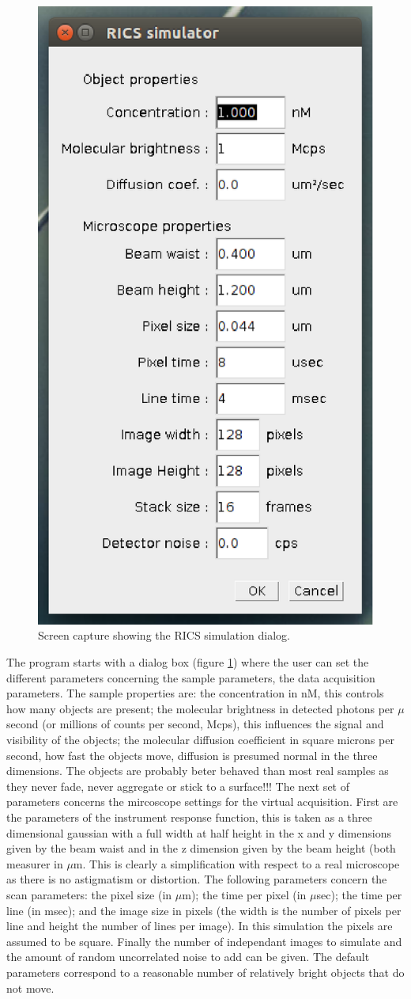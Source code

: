 \documentclass[10pt]{article}
\begin{document}
\begin{figure}
\centerline{\includegraphics[width=.25\textwidth]{Images/MenuSimDialog.eps}}
\caption{Screen capture showing the RICS simulation dialog.}
\label{fig:MenuSimDialog}
\end{figure}

The program starts with a dialog box (figure \ref{fig:MenuSimDialog}) where the
user can set the different parameters concerning the sample parameters, the data 
acquisition parameters. 
The sample properties are: 
the concentration in nM, this controls how many objects are present; 
the molecular brightness in detected photons per $\mu $second (or millions of
    counts per second, Mcps), this influences the signal and visibility of the objects; 
the molecular diffusion coefficient in square microns per second, how fast the 
    objects move, diffusion is presumed normal in the three dimensions. 
The objects are probably beter behaved than most real samples as they never fade, 
never aggregate or stick to a surface!!!
The next set of parameters concerns the mircoscope settings for the virtual 
acquisition. First are the parameters of the instrument response function, this 
is taken as a three dimensional gaussian with a full width at half height in the 
x and y dimensions given by the beam waist and in the z dimension given by the 
beam height (both measurer in $\mu $m. This is clearly a simplification with 
respect to a real microscope as there is no astigmatism or distortion. 
The following parameters concern the scan parameters: 
the pixel size (in $\mu $m); 
the time per pixel (in $\mu $sec);
the time per line (in msec);
and the image size in pixels (the width is the number of pixels per line 
and height the number of lines per image). 
In this simulation the pixels are assumed to be square. 
Finally the number of independant images to simulate and the amount of random uncorrelated 
noise to add can be given. The default parameters correspond to a reasonable 
number of relatively bright objects that do not move.
\end{document}
